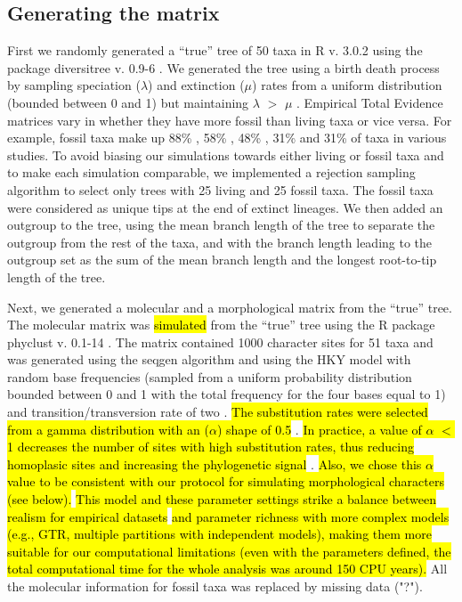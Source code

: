 \documentclass[12pt,letterpaper]{article}
\begin{document}

\subsection{Generating the matrix}
\label{Generating_the_matrix}
First we randomly generated a ``true'' tree of 50 taxa in R v. 3.0.2 \citep{R302} using the package diversitree v. 0.9-6 \citep{fitzjohndiversitree2012}.
We generated the tree using a birth death process by sampling speciation ($\lambda$) and extinction ($\mu$) rates from a uniform distribution (bounded between 0 and 1) but maintaining $\lambda$ $>$ $\mu$ \citep{paradistime-dependent2011}.
Empirical Total Evidence matrices vary in whether they have more fossil than living taxa or vice versa.
For example, fossil taxa make up 88\% \citep{beckancient2014}, 58\% \citep{schragocombining2013}, 48\% \citep{pyrondivergence2011}, 31\% \citep{ronquista2012} and 31\% \citep{slaterphylogenetic2013} of taxa in various studies.
To avoid biasing our simulations towards either living or fossil taxa and to make each simulation comparable, we implemented a rejection sampling algorithm to select only trees with 25 living and 25 fossil taxa.
The fossil taxa were considered as unique tips at the end of extinct lineages.
We then added an outgroup to the tree, using the mean branch length of the tree to separate the outgroup from the rest of the taxa, and with the branch length leading to the outgroup set as the sum of the mean branch length and the longest root-to-tip length of the tree.

Next, we generated a molecular and a morphological matrix from the ``true'' tree.
The molecular matrix was \hl{simulated} from the ``true'' tree using the R package phyclust v. 0.1-14 \citep{chen2011}.
The matrix contained 1000 character sites for 51 taxa and was generated using the seqgen algorithm \citep{ranbaut1997seqgen} and using the HKY model \citep{HKY85} with random base frequencies (sampled from a uniform probability distribution bounded between 0 and 1 with the total frequency for the four bases equal to 1) and transition/transversion rate of two \citep{douadycomparison2003}.
\hl{The substitution rates were selected from a gamma distribution with an ($\alpha$) shape of 0.5} \citep{yangamong-site1996}.
\hl{In practice, a value of $\alpha$ $<$ 1 decreases the number of sites with high substitution rates, thus reducing homoplasic sites and increasing the phylogenetic signal }\citep{Hassanin1998611,EstoupHomoplasy}.
\hl{Also, we chose this $\alpha$ value to be consistent with our protocol for simulating morphological characters (see below).}
\hl{This model and these parameter settings strike a balance between realism for empirical datasets }\citep[\hl{e.g.}][]{douadycomparison2003,kellymolecular2014}\hl{ and parameter richness with more complex models (e.g., GTR, multiple partitions with independent models), making them more suitable for our computational limitations (even with the parameters defined, the total computational time for the whole analysis was around 150 CPU years).}
All the molecular information for fossil taxa was replaced by missing data ("?").
\end{document}
